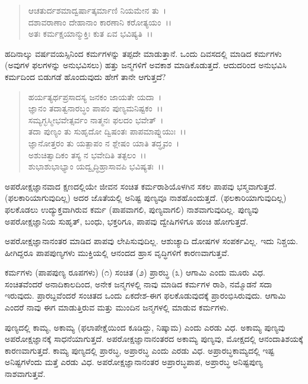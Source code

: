 \begin{verse}
ಆಚತುರ್ದಶಮಾದ್ವರ್ಷಾತ್ಕರ್ಮಾಣಿ ನಿಯಮೇನ ತು~।\\ ದಶಾವರಾಣಾಂ ದೇಹಾನಾಂ ಕಾರಣಾನಿ ಕರೋತ್ಯಯಂ~।।\\ ಅತಃ ಕರ್ಮಕ್ಷಯಾನ್ಮುಕ್ತಿಃ ಕುತ ಏವ ಭವಿಷ್ಯತಿ~।।
\end{verse}

ಹದಿನಾಲ್ಕು ವರ್ಷವಯಸ್ಸಿನಿಂದ ಕರ್ಮಗಳನ್ನು ತಪ್ಪದೇ ಮಾಡುತ್ತಾನೆ. ಒಂದು ದಿವಸದಲ್ಲಿ ಮಾಡಿದ ಕರ್ಮಗಳು (ಅವುಗಳ ಫಲಗಳನ್ನು ಅನುಭವಿಸಲು) ಹತ್ತು ಜನ್ಮಗಳಿಗೆ ಅವಕಾಶ ಮಾಡಿಕೊಡುತ್ತದೆ. ಆದುದರಿಂದ ಅನುಭವಿಸಿ ಕರ್ಮದಿಂದ ಬಿಡುಗಡೆ ಹೊಂದುವುದು ಹೇಗೆ ತಾನೇ ಆಗುತ್ತದೆ?

\begin{verse}
ಹರ್ಯತ್ಯರ್ಥಪ್ರಸಾದಸ್ಯ ಜನಕಂ ಜಾಯತೇ ಯದಾ~।\\ ಜ್ಞಾನಂ ತದಾತ್ವನಾರಬ್ಧಂ ಪಾಪಂ ಪುಣ್ಯಮನಿಷ್ಟಕಂ~।।\\ ಸಮ್ಯಗ್ಭಸ್ಮೀಭವೇತ್ಸರ್ವಂ ನಾತ್ಮನಃ ಫಲದಂ ಭವೇತ್~।\\ ತದಾ ಪುಣ್ಯಂ ತು ಸುಹೃದೋ ದ್ವಿಷಂತಃ ಪಾಪಮಾಪ್ನುಯುಃ~।।\\ ಜ್ಞಾನೋತ್ತರಂ ತು ಯತ್ಪಾಪಂ ನ ಶ್ಲೇಷಂ ಯಾತಿ ತದ್ಧೃವಂ~।\\ ಅಶುಚಿತ್ವಾದಿಕಂ ತಸ್ಯ ನ ಭವೇದಿತಿ ತತ್ಫಲಂ~।।\\ ಶುಭಾಶುಭಾಭ್ಯಾಂ ಯದ್ವೃದ್ಧಿಹ್ರಾಸಾವಪಿ ಭವಿಷ್ಯತಃ~।।
\end{verse}


ಅಪರೋಕ್ಷಜ್ಞಾನವಾದ ಕ್ಷಣದಲ್ಲಿಯೇ ಜೀವನ ಸಂಚಿತ ಕರ್ಮರಾಶಿಯೊಳಗಿನ ಸಕಲ ಪಾಪವು ಭಸ್ಮವಾಗುತ್ತದೆ. (ಫಲಕಾರಿಯಾಗುವುದಿಲ್ಲ) ಅದರ ಜೊತೆಯಲ್ಲಿ ಅನಿಷ್ಟ ಪುಣ್ಯವೂ ನಾಶಹೊಂದುತ್ತದೆ. (ಫಲಕಾರಿಯಾಗುವುದಿಲ್ಲ) ಫಲಕೊಡಲು ಉದ್ಯುಕ್ತವಾಗಿರುವ ಕರ್ಮ (ಪಾಪವಾಗಲಿ, ಪುಣ್ಯವಾಗಲಿ) ನಾಶವಾಗುವುದಿಲ್ಲ. ಪುಣ್ಯವು ಅಪರೋಕ್ಷಜ್ಞಾನಿಯ ಸುಹೃತ್, ಬಂಧು, ಭಕ್ತರಿಗೂ, ಪಾಪವು ದ್ವೇಷಿಗಳಿಗೂ ಹಂಚಿ ಹೋಗುತ್ತದೆ.

ಅಪರೋಕ್ಷಜ್ಞಾನಾನಂತರ ಮಾಡಿದ ಪಾಪವು ಲೇಪಿಸುವುದಿಲ್ಲ. ಆಶುಚ್ಯಾದಿ ದೋಷಗಳ ಸಂಪರ್ಕವಿಲ್ಲ. ಇದು ನಿಶ್ಚಯ. ಹೀಗಿದ್ದರೂ ಪಾಪಪುಣ್ಯಗಳು ಮುಕ್ತಿಯಲ್ಲಿ ಆನಂದದ ಹ್ರಾಸ ವೃದ್ಧಿಗಳಿಗೆ ಕಾರಣವಾಗುತ್ತವೆ.

ಕರ್ಮಗಳು (ಪಾಪಪುಣ್ಯ ರೂಪಗಳು) (೧) ಸಂಚಿತ (೨) ಪ್ರಾರಬ್ಧ (೩) ಆಗಾಮಿ ಎಂದು ಮೂರು ವಿಧ. ಸಂಚಿತವೆಂದರೆ ಅನಾದಿಕಾಲದಿಂದ, ಅನೇಕ ಜನ್ಮಗಳಲ್ಲಿ ನಾವು ಮಾಡಿದ ಕರ್ಮಗಳ ರಾಶಿ, ನಮ್ಮೊಡನೆ ಸದಾ ಇರುವುದು. ಪ್ರಾರಬ್ದವೆಂದರೆ ಸಂಚಿತದ ಒಂದು ಏಕದೇಶ-ಈಗ ಫಲಕೊಡುವುದಕ್ಕೆ ಪ್ರಾರಂಭಿಸಿರುವುದು. ಆಗಾಮಿ ಎಂದರೆ ನಾವು ಈಗ ಮಾಡುತ್ತಿರುವ ಮತ್ತು ಮುಂದಿನ ಜನ್ಮಗಳಲ್ಲಿ ಮಾಡುವ ಕರ್ಮಗಳು.

ಪುಣ್ಯದಲ್ಲಿ ಕಾಮ್ಯ, ಅಕಾಮ್ಯ (ಫಲಾಪೇಕ್ಷೆಯಿಂದ ಕೂಡಿದ್ದು, ನಿಷ್ಕಾಮ) ಎಂದು ಎರಡು ವಿಧ. ಅಕಾಮ್ಯ ಪುಣ್ಯವು ಅಪರೋಕ್ಷಜ್ಞಾನಕ್ಕೆ ಸಾಧನೆಯಾಗುತ್ತದೆ. ಅಪರೋಕ್ಷಜ್ಞಾನಾನಂತರದ ಅಕಾಮ್ಯ ಪುಣ್ಯವು, ಮೋಕ್ಷದಲ್ಲಿ ಆನಂದಾತಿಶಯಕ್ಕೆ ಕಾರಣವಾಗುತ್ತದೆ. ಕಾಮ್ಯ ಪುಣ್ಯದಲ್ಲಿ ಪ್ರಾರಬ್ಧ, ಅಪ್ರಾರಬ್ಧ ಎಂದು ಎರಡು ವಿಧ. ಅಪ್ರಾರಬ್ಧಕಾಮ್ಯದಲ್ಲಿ ಇಷ್ಟ ಅನಿಷ್ಟಗಳೆಂದು ಮತ್ತೆ ಎರಡು ವಿಧ. ಅಪರೋಕ್ಷಜ್ಞಾನಾನಂತರ ಅಪ್ರಾರಬ್ಧಪಾಪ, ಅಪ್ರಾರಬ್ಧ ಅನಿಷ್ಟಪುಣ್ಯ ನಾಶವಾಗುತ್ತವೆ.

